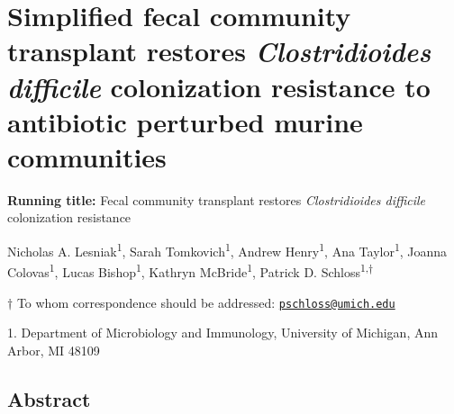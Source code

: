 \documentclass[
  12pt,
]{article}
\author{}
\date{\vspace{-2.5em}}
\begin{document}
\linenumbers
\doublespacing

\hypertarget{simplified-fecal-community-transplant-restores-clostridioides-difficile-colonization-resistance-to-antibiotic-perturbed-murine-communities}{%
\section{\texorpdfstring{Simplified fecal community transplant restores
\emph{Clostridioides difficile} colonization resistance to antibiotic
perturbed murine
communities}{Simplified fecal community transplant restores Clostridioides difficile colonization resistance to antibiotic perturbed murine communities}}\label{simplified-fecal-community-transplant-restores-clostridioides-difficile-colonization-resistance-to-antibiotic-perturbed-murine-communities}}

\vspace{30mm}

\textbf{Running title:} Fecal community transplant restores
\emph{Clostridioides difficile} colonization resistance

\vspace{20mm}

Nicholas A. Lesniak\textsuperscript{1}, Sarah
Tomkovich\textsuperscript{1}, Andrew Henry\textsuperscript{1}, Ana
Taylor\textsuperscript{1}, Joanna Colovas\textsuperscript{1}, Lucas
Bishop\textsuperscript{1}, Kathryn McBride\textsuperscript{1}, Patrick
D. Schloss\textsuperscript{1,\(\dagger\)}

\vspace{40mm}

\(\dagger\) To whom correspondence should be addressed:
\href{mailto:pschloss@umich.edu}{\nolinkurl{pschloss@umich.edu}}

1. Department of Microbiology and Immunology, University of Michigan,
Ann Arbor, MI 48109

\newpage

\hypertarget{abstract}{%
\subsection{Abstract}\label{abstract}}
\end{document}
